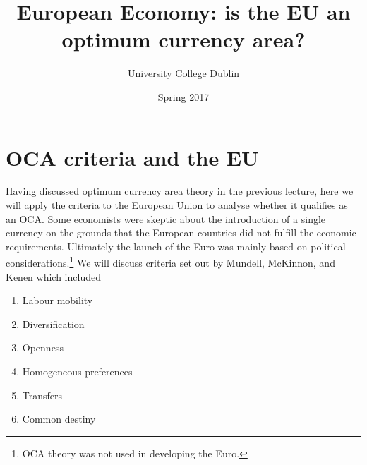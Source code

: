 \documentclass{tufte-handout}
\title{European Economy: is the EU an optimum currency area?}
\author{University College Dublin}
\date{Spring 2017}
\begin{document}
\maketitle  
\section{OCA criteria and the EU}
Having discussed optimum currency area theory in the previous lecture, here we will apply the criteria to the European Union to analyse whether it qualifies as an OCA.
Some economists were skeptic about the introduction of a single currency on the grounds that the European countries did not fulfill the economic requirements. 
Ultimately the launch of the Euro was mainly based on political considerations.\footnote{OCA theory was not used in developing the Euro.}
We will discuss criteria set out by Mundell, McKinnon, and Kenen which included
\begin{enumerate}
  \item Labour mobility
  \item Diversification
  \item Openness
  \item Homogeneous preferences
  \item Transfers
  \item Common destiny
\end{enumerate}

\end{document}

